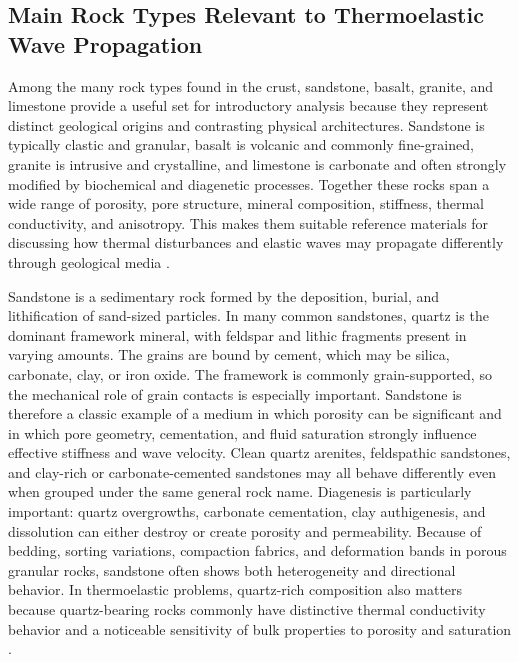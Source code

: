 \subsection{Main Rock Types Relevant to Thermoelastic Wave Propagation}

Among the many rock types found in the crust, sandstone, basalt, granite, and limestone provide a useful set for introductory analysis because they represent distinct geological origins and contrasting physical architectures. Sandstone is typically clastic and granular, basalt is volcanic and commonly fine-grained, granite is intrusive and crystalline, and limestone is carbonate and often strongly modified by biochemical and diagenetic processes. Together these rocks span a wide range of porosity, pore structure, mineral composition, stiffness, thermal conductivity, and anisotropy. This makes them suitable reference materials for discussing how thermal disturbances and elastic waves may propagate differently through geological media \cite{mavko2009,robertson1988,earle2019}.

Sandstone is a sedimentary rock formed by the deposition, burial, and lithification of sand-sized particles. In many common sandstones, quartz is the dominant framework mineral, with feldspar and lithic fragments present in varying amounts. The grains are bound by cement, which may be silica, carbonate, clay, or iron oxide. The framework is commonly grain-supported, so the mechanical role of grain contacts is especially important. Sandstone is therefore a classic example of a medium in which porosity can be significant and in which pore geometry, cementation, and fluid saturation strongly influence effective stiffness and wave velocity. Clean quartz arenites, feldspathic sandstones, and clay-rich or carbonate-cemented sandstones may all behave differently even when grouped under the same general rock name. Diagenesis is particularly important: quartz overgrowths, carbonate cementation, clay authigenesis, and dissolution can either destroy or create porosity and permeability. Because of bedding, sorting variations, compaction fabrics, and deformation bands in porous granular rocks, sandstone often shows both heterogeneity and directional behavior. In thermoelastic problems, quartz-rich composition also matters because quartz-bearing rocks commonly have distinctive thermal conductivity behavior and a noticeable sensitivity of bulk properties to porosity and saturation \cite{earle2019,mavko2009,robertson1988}.

